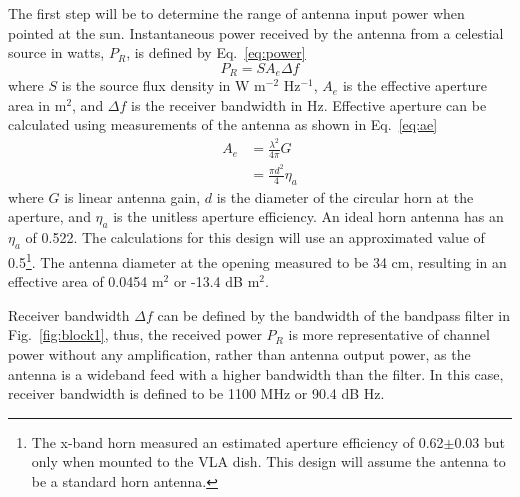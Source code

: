 \documentclass[titlepage]{article}
\begin{document}
The first step will be to determine the range of antenna input power when pointed at the sun. Instantaneous power received by the antenna from a celestial source in watts, $P_R$, is defined by Eq.~\ref{eq:power}
\begin{equation}
    P_R = S A_e \Delta f
\label{eq:power}
\end{equation}
where $S$ is the source flux density in W m$^{-2}$ Hz$^{-1}$, $A_e$ is the effective aperture area in m$^2$, and $\Delta f$ is the receiver bandwidth in Hz\cite[eq.~(41-2)]{aeh}. Effective aperture can be calculated using measurements of the antenna as shown in Eq.~\ref{eq:ae}
\begin{equation} \label{eq:ae}
\begin{split}
    A_e &= \frac{\lambda^2}{4\pi}G \\
    &= \frac{\pi d^2}{4} \eta_a
\end{split}
\end{equation}
where $G$ is linear antenna gain, $d$ is the diameter of the circular horn at the aperture, and $\eta_a$ is the unitless aperture efficiency\cite[pg.~(15-27)]{aeh}\cite[eq.~(5.58)]{tora}. An ideal horn antenna has an $\eta_a$ of 0.522. The calculations for this design will use an approximated value of 0.5\footnote{The x-band horn measured an estimated aperture efficiency of 0.62$\pm$0.03 but only when mounted to the VLA dish\cite{xbandvla}. This design will assume the antenna to be a standard horn antenna.}. The antenna diameter at the opening measured to be 34 cm, resulting in an effective area of 0.0454 m$^2$ or -13.4 dB m$^2$.

Receiver bandwidth $\Delta f$ can be defined by the bandwidth of the bandpass filter in Fig.~\ref{fig:block1}, thus, the received power $P_R$ is more representative of channel power without any amplification, rather than antenna output power, as the antenna is a wideband feed with a higher bandwidth than the filter. In this case, receiver bandwidth is defined to be 1100 MHz or 90.4 dB Hz.
\end{document}

